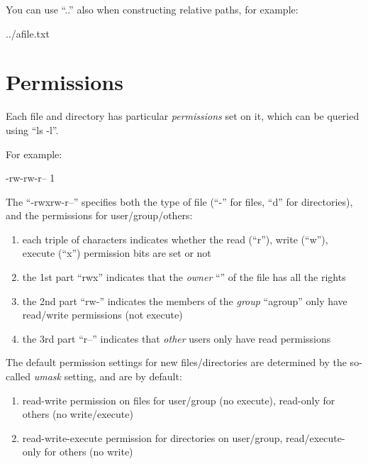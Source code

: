 You can use ``..'' also when constructing relative paths, for example:

\begin{prompt}
../afile.txt
\end{prompt}

\section{Permissions}

Each file and directory has particular \emph{permissions} set on it, which can be queried using ``ls -l''.

For example:

\begin{prompt}
-rw-rw-r-- 1 %
\end{prompt}

The ``-rwxrw-r--'' specifies both the type of file (``-'' for files, ``d'' for directories), and the permissions for user/group/others:

\begin{enumerate}
\item each triple of characters indicates whether the read (``r''), write (``w''), execute (``x'') permission bits are set or not
\item the 1st part ``rwx'' indicates that the \emph{owner} ``\userid'' of the file has all the rights
\item the 2nd part ``rw-'' indicates the members of the \emph{group} ``agroup'' only have read/write permissions (not execute)
\item the 3rd part ``r--'' indicates that \emph{other} users only have read permissions
\end{enumerate}

The default permission settings for new files/directories are determined by the so-called \emph{umask} setting, and are by default:

\begin{enumerate}
\item read-write permission on files for user/group (no execute), read-only for others (no write/execute)
\item read-write-execute permission for directories on user/group, read/execute-only for others (no write)
\end{enumerate}

